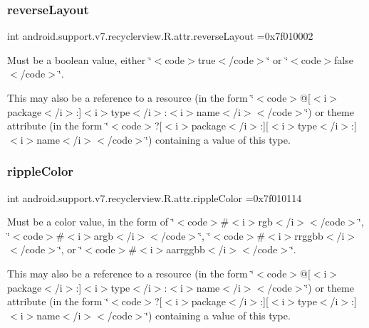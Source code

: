\subsubsection{\texorpdfstring{reverse\+Layout}{reverseLayout}}
{\footnotesize\ttfamily int android.\+support.\+v7.\+recyclerview.\+R.\+attr.\+reverse\+Layout =0x7f010002\hspace{0.3cm}{\ttfamily [static]}}

Must be a boolean value, either \char`\"{}$<$code$>$true$<$/code$>$\char`\"{} or \char`\"{}$<$code$>$false$<$/code$>$\char`\"{}. 

This may also be a reference to a resource (in the form \char`\"{}$<$code$>$@\mbox{[}$<$i$>$package$<$/i$>$\+:\mbox{]}$<$i$>$type$<$/i$>$\+:$<$i$>$name$<$/i$>$$<$/code$>$\char`\"{}) or theme attribute (in the form \char`\"{}$<$code$>$?\mbox{[}$<$i$>$package$<$/i$>$\+:\mbox{]}\mbox{[}$<$i$>$type$<$/i$>$\+:\mbox{]}$<$i$>$name$<$/i$>$$<$/code$>$\char`\"{}) containing a value of this type. \mbox{\label{classandroid_1_1support_1_1v7_1_1recyclerview_1_1R_1_1attr_a8c1307e77d103cc8df93c49fe656d8b5}} 
\subsubsection{\texorpdfstring{ripple\+Color}{rippleColor}}
{\footnotesize\ttfamily int android.\+support.\+v7.\+recyclerview.\+R.\+attr.\+ripple\+Color =0x7f010114\hspace{0.3cm}{\ttfamily [static]}}

Must be a color value, in the form of \char`\"{}$<$code$>$\#$<$i$>$rgb$<$/i$>$$<$/code$>$\char`\"{}, \char`\"{}$<$code$>$\#$<$i$>$argb$<$/i$>$$<$/code$>$\char`\"{}, \char`\"{}$<$code$>$\#$<$i$>$rrggbb$<$/i$>$$<$/code$>$\char`\"{}, or \char`\"{}$<$code$>$\#$<$i$>$aarrggbb$<$/i$>$$<$/code$>$\char`\"{}. 

This may also be a reference to a resource (in the form \char`\"{}$<$code$>$@\mbox{[}$<$i$>$package$<$/i$>$\+:\mbox{]}$<$i$>$type$<$/i$>$\+:$<$i$>$name$<$/i$>$$<$/code$>$\char`\"{}) or theme attribute (in the form \char`\"{}$<$code$>$?\mbox{[}$<$i$>$package$<$/i$>$\+:\mbox{]}\mbox{[}$<$i$>$type$<$/i$>$\+:\mbox{]}$<$i$>$name$<$/i$>$$<$/code$>$\char`\"{}) containing a value of this type. \mbox{\label{classandroid_1_1support_1_1v7_1_1recyclerview_1_1R_1_1attr_aef6730a6bb29733d5e508bb634dcad80}} 
